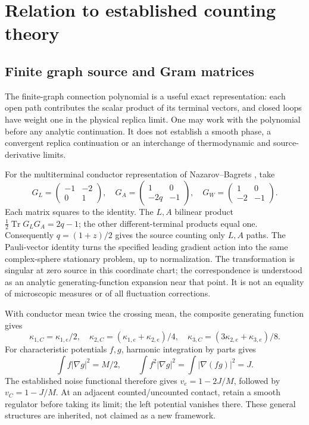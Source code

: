 \documentclass[10pt,a4paper]{article}
\begin{document}
\section{Relation to established counting theory}
\subsection{Finite graph source and Gram matrices}
The finite-graph connection polynomial is a useful exact representation:
each open path contributes the scalar product of its terminal vectors,
and closed loops have weight one in the physical replica limit.
One may work with the polynomial before any analytic continuation.
It does not establish a smooth phase, a convergent replica continuation
or an interchange of thermodynamic and source-derivative limits.

For the multiterminal conductor representation of Nazarov--Bagrets \cite{NB},
take
\[
G_L=\begin{pmatrix}-1&-2\\0&1\end{pmatrix},\quad
G_A=\begin{pmatrix}1&0\\-2q&-1\end{pmatrix},\quad
G_W=\begin{pmatrix}1&0\\-2&-1\end{pmatrix}.
\]
Each matrix squares to the identity.
The \(L,A\) bilinear product \(\tfrac12\operatorname{Tr}G_LG_A=2q-1\);
the other different-terminal products equal one.
Consequently \(q=(1+z)/2\) gives the source counting only \(L,A\) paths.
The Pauli-vector identity turns the specified leading gradient action
into the same complex-sphere stationary problem, up to normalization.
The transformation is singular at zero source in this coordinate chart;
the correspondence is understood as an analytic generating-function
expansion near that point. It is not an equality of microscopic measures
or of all fluctuation corrections.

With conductor mean twice the crossing mean, the composite generating
function gives
\[
\kappa_{1,C}=\kappa_{1,e}/2,\quad
\kappa_{2,C}=(\kappa_{1,e}+\kappa_{2,e})/4,\quad
\kappa_{3,C}=(3\kappa_{2,e}+\kappa_{3,e})/8.
\]
For characteristic potentials \(f,g\), harmonic integration by parts gives
\[
\int f|\nabla g|^2=M/2,\qquad
\int f^2|\nabla g|^2=\int|\nabla(fg)|^2=J.
\]
The established noise functional \cite{SL,SLlong} therefore gives
\(v_e=1-2J/M\), followed by \(v_C=1-J/M\).
At an adjacent counted/uncounted contact, retain a smooth regulator before
taking its limit; the left potential vanishes there.
These general structures are inherited, not claimed as a new framework.
\end{document}
